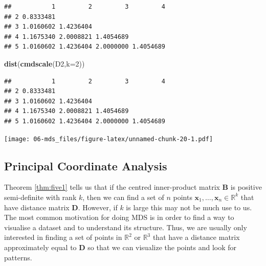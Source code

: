 \documentclass[]{book}
\newenvironment{Shaded}{\begin{snugshade}}{\end{snugshade}}
\newcommand{\DataTypeTok}[1]{\textcolor[rgb]{0.13,0.29,0.53}{#1}}
\newcommand{\DecValTok}[1]{\textcolor[rgb]{0.00,0.00,0.81}{#1}}
\newcommand{\KeywordTok}[1]{\textcolor[rgb]{0.13,0.29,0.53}{\textbf{#1}}}
\newcommand{\NormalTok}[1]{#1}
\newcommand{\OperatorTok}[1]{\textcolor[rgb]{0.81,0.36,0.00}{\textbf{#1}}}
\newcommand{\StringTok}[1]{\textcolor[rgb]{0.31,0.60,0.02}{#1}}
\theoremstyle{definition}
\theoremstyle{definition}
\theoremstyle{definition}
\theoremstyle{remark}
\begin{document}
\begin{Shaded}
\end{Shaded}

\begin{verbatim}
##           1         2         3         4
## 2 0.8333481                              
## 3 1.0160602 1.4236404                    
## 4 1.1675340 2.0008821 1.4054689          
## 5 1.0160602 1.4236404 2.0000000 1.4054689
\end{verbatim}

\begin{Shaded}
\begin{Highlighting}[]
\KeywordTok{dist}\NormalTok{(}\KeywordTok{cmdscale}\NormalTok{(D2,}\DataTypeTok{k=}\DecValTok{2}\NormalTok{))}
\end{Highlighting}
\end{Shaded}

\begin{verbatim}
##           1         2         3         4
## 2 0.8333481                              
## 3 1.0160602 1.4236404                    
## 4 1.1675340 2.0008821 1.4054689          
## 5 1.0160602 1.4236404 2.0000000 1.4054689
\end{verbatim}

\texttt{[image: 06-mds\_files/figure-latex/unnamed-chunk-20-1.pdf]}

\hypertarget{principal-coordinate-analysis}{%
\subsection{Principal Coordinate Analysis}\label{principal-coordinate-analysis}}

Theorem \ref{thm:five1} tells us that if the centred inner-product matrix
\(\mathbf B\) is positive semi-definite with rank \(k\), then we can find a set of \(n\) points \(\mathbf x_1,\ldots, \mathbf x_n \in \mathbb{R}^k\) that have distance matrix \(\mathbf D\). However, if \(k\) is large this may not be much use to us. The most common motivation for doing MDS is in order to find a way to visualise a dataset and to understand its structure. Thus, we are usually only interested in finding a set of points in \(\mathbb{R}^2\) or \(\mathbb{R}^3\) that have a distance matrix approximately equal to \(\mathbf D\) so that we can visualize the points and look for patterns.
\end{document}
